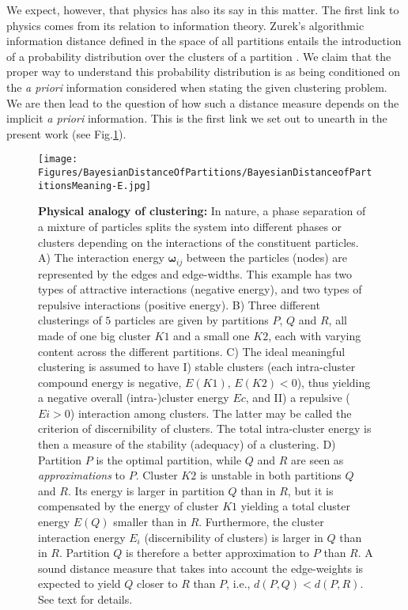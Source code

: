 \documentclass[twocolumn,aps,sort,nofootinbib]{revtex4}
\begin{document}
We expect, however, that physics has also its say in this matter.  
The first link to physics comes from its relation 
to information theory\cite{Jaynes,Ellerman10}. 
Zurek's algorithmic information distance defined in
the space of all partitions entails the introduction of
a probability distribution over 
the clusters of a partition \cite{Zurek89-1,Zurek89-2,MMeila03}.
We claim that the proper way to understand
this probability distribution is as being 
conditioned on the {\em a priori} information
considered when stating the given clustering problem.
We are then lead to the question of how
such a distance measure depends on the 
implicit {\em a priori} information.
This is the first link we set out
to unearth in the present work (see Fig.\ref{BayesianDistanceMeasure}).

\begin{figure}
\centering
\texttt{[image: Figures/BayesianDistanceOfPartitions/BayesianDistanceofPartitionsMeaning-E.jpg]}
\caption{
{\bf Physical analogy of clustering:} In nature, a phase separation of a mixture of 
particles splits the system into different phases or clusters depending on the 
interactions of the constituent particles. 
A) The interaction energy $\mathbf{\omega}_{ij}$ 
between the particles (nodes) are represented by the edges and edge-widths. 
This example has two types of attractive interactions (negative energy), and 
two types of repulsive interactions (positive energy). 
B) Three different 
clusterings of $5$ particles are given by partitions $P$, $Q$ and $R$, all made 
of one big cluster $K1$ and a small one $K2$, each with varying content across 
the different partitions. 
C) The ideal meaningful clustering is assumed to 
have I) stable clusters (each intra-cluster compound energy is negative, 
$E(K1),\, E(K2)<0$), thus yielding a negative overall (intra-)cluster energy $Ec$, 
and II) a repulsive ($Ei>0$) interaction among clusters. The latter may be called 
the criterion of discernibility of clusters. The total intra-cluster energy 
is then a measure of the stability (adequacy) of a clustering. 
D) Partition 
$P$ is the optimal partition, while $Q$ and $R$ are seen as {\sl approximations} to $P$. 
Cluster $K2$ is unstable in both partitions $Q$ and $R$. Its energy is larger 
in partition $Q$ than in $R$, but it is compensated by the energy of cluster 
$K1$ yielding a total cluster energy $E(Q)$ smaller than in $R$. Furthermore, 
the cluster interaction energy $E_i$ (discernibility of clusters) is larger 
in $Q$ than in $R$. Partition $Q$ is therefore a better approximation to $P$ 
than $R$. 
A sound distance measure that takes into account the edge-weights is expected 
to yield $Q$ closer to $R$ than $P$, i.e., $d(P,Q) < d(P,R)$. 
See text for details.
}
\label{BayesianDistanceMeasure}
\end{figure}
\end{document}
